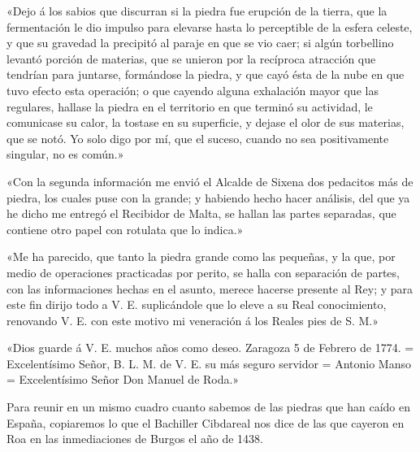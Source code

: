 \documentclass[a4paper, 11pt, oneside, polutonikogreek, spanish]{article}
\begin{document}
«Dejo á los sabios que discurran si la piedra fue erupción de la tierra, que la fermentación le dio impulso para elevarse hasta lo perceptible de la esfera celeste, y que su gravedad la precipitó al paraje en que se vio caer; si algún torbellino levantó porción de materias, que se unieron por la recíproca atracción que tendrían para juntarse, formándose la piedra, y que cayó ésta de la nube en que tuvo efecto esta operación; o que cayendo alguna exhalación mayor que las regulares, hallase la piedra en el territorio en que terminó su actividad, le comunicase su calor, la tostase en su superficie, y dejase el olor de sus materias, que se notó. Yo solo digo por mí, que el suceso, cuando no sea positivamente singular, no es común.»

«Con la segunda información me envió el Alcalde de Sixena dos pedacitos más de piedra, los cuales puse con la grande; y habiendo hecho hacer análisis, del que ya he dicho me entregó el Recibidor de Malta, se hallan las partes separadas, que contiene otro papel con rotulata que lo indica.»

«Me ha parecido, que tanto la piedra grande como las pequeñas, y la que, por medio de operaciones practicadas por perito, se halla con separación de partes, con las informaciones hechas en el asunto, merece hacerse presente al Rey; y para este fin dirijo todo a V. E. suplicándole que lo eleve a su Real conocimiento, renovando V. E. con este motivo mi veneración á los Reales pies de S. M.»

«Dios guarde á V. E. muchos años como deseo. Zaragoza 5 de Febrero de 1774. = Excelentísimo Señor, B. L. M. de V. E. su más seguro servidor = Antonio Manso = Excelentísimo Señor Don Manuel de Roda.»

Para reunir en un mismo cuadro cuanto sabemos de las piedras que han caído en España, copiaremos lo que el Bachiller Cibdareal nos dice de las que cayeron en Roa en las inmediaciones de Burgos el año de 1438.
\end{document}
